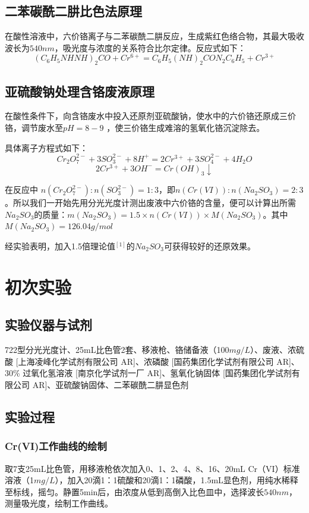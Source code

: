 \documentclass[UTF8,a4paper,11pt,twocolumn]{ctexart}
\begin{document}
\subsection{二苯碳酰二肼比色法原理}
在酸性溶液中，六价铬离子与二苯碳酰二肼反应，生成紫红色络合物，其最大吸收波长为$540nm$，吸光度与浓度的关系符合比尔定律。反应式如下：
{\tiny $$(C_6H_5NHNH)_2CO + Cr^{6+} = C_6H_5(NH)_2CON_2C_6H_5 + Cr^{3+}$$}

\subsection{亚硫酸钠处理含铬废液原理}
在酸性条件下，向含铬废水中投入还原剂亚硫酸钠，使水中的六价铬还原成三价铬，调节废水至$pH = 8-9$ ，使三价铬生成难溶的氢氧化铬沉淀除去。

具体离子方程式如下：
{\small $$Cr_2O_7^{2-} + 3SO_3^{2-} + 8H^+ = 2Cr^{3+} + 3SO_4^{2-} +4H_2O$$}
{\small $$2Cr^{3+} + 3OH^- = Cr(OH)_3 \downarrow$$}

在反应中 {\small $n(Cr_2O_7^{2-}):n(SO_3^{2-})=1:3$}，即{\small $n(Cr(VI)):n(Na_2SO_3)=2:3$}。所以我们一开始先用分光光度计测出废液中六价铬的含量，便可以计算出所需$Na_2SO_3$的质量：{\small $m(Na_2SO_3)=1.5×n(Cr(VI))×M(Na_2SO_3)$}。其中{\small $M(Na_2SO_3)=126.04g/mol$}

经实验表明，加入1.5倍理论值$^{[1]}$的$Na_2SO_3$可获得较好的还原效果。

\section{初次实验}
\subsection{实验仪器与试剂}
722型分光光度计、25mL比色管2套、移液枪、铬储备液（100$mg/L$）、废液、浓硫酸 [上海凌峰化学试剂有限公司 AR]、浓磷酸 [国药集团化学试剂有限公司 AR]、30\% 过氧化氢溶液 [南京化学试剂一厂 AR]、氢氧化钠固体 [国药集团化学试剂有限公司 AR]、亚硫酸钠固体、二苯碳酰二肼显色剂
\subsection{实验过程}
\subsubsection{Cr(VI)工作曲线的绘制}
取7支25mL比色管，用移液枪依次加入0、1、2、4、8、16、20mL Cr（VI）标准溶液（1$mg/L$），加入20滴1：1硫酸和20滴1：1磷酸，1.5mL显色剂，用纯水稀释至标线，摇匀。静置5min后，由浓度从低到高倒入比色皿中，选择波长$540nm$，测量吸光度，绘制工作曲线。
\end{document}
